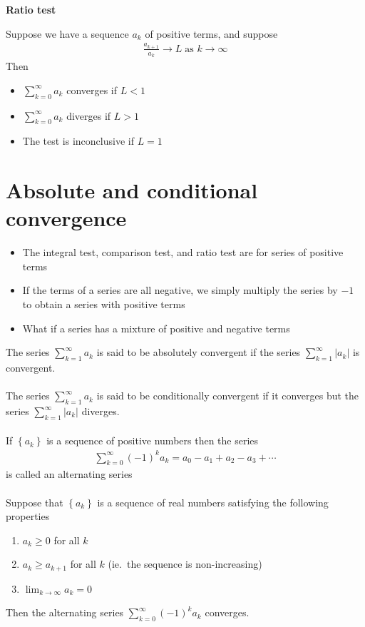 \documentclass{report}
\begin{document}
		\textbf{Ratio test}

			Suppose we have a sequence $a_k$ of positive terms, and suppose
			\begin{align*}
				\frac{a_{k+1}}{a_k} \to L \; \text{as } k \to \infty
			\end{align*}
			Then
			\begin{itemize}
				\item $\displaystyle\sum_{k=0}^\infty a_k$ converges if $L < 1$
				\item $\displaystyle\sum_{k=0}^\infty a_k$ diverges if $L > 1$
				\item The test is inconclusive if $L = 1$
			\end{itemize}

	\section{Absolute and conditional convergence}

		\begin{itemize}
			\item The integral test, comparison test, and ratio test are for series of positive terms
			\item If the terms of a series are all negative, we simply multiply the series by $-1$ to obtain a series with positive terms
			\item What if a series has a mixture of positive and negative terms
		\end{itemize}

		The series $\displaystyle\sum_{k=1}^\infty a_k$ is said to be absolutely convergent if the series $\displaystyle\sum_{k=1}^\infty |a_k|$ is convergent.
		\\ \\
		The series $\displaystyle\sum_{k=1}^\infty a_k$ is said to be conditionally convergent if it converges but the series $\displaystyle\sum_{k=1}^\infty |a_k|$ diverges.
		\\ \\
		If $\left\{a_k\right\}$ is a sequence of positive numbers then the series
		\begin{align*}
			\sum_{k=0}^\infty (-1)^k a_k = a_0 - a_1 + a_2 - a_3 + \cdots
		\end{align*}
		is called an alternating series
		\\ \\
		Suppose that $\left\{a_k\right\}$ is a sequence of real numbers satisfying the following properties
		\begin{enumerate}
			\item $a_k \geq 0$ for all $k$
			\item $a_k \geq a_{k+1}$ for all $k$ (ie.\ the sequence is non-increasing)
			\item $\displaystyle\lim_{k \to \infty} a_k = 0$
		\end{enumerate}
		Then the alternating series $\displaystyle\sum_{k=0}^\infty (-1)^k a_k$ converges.
\end{document}

